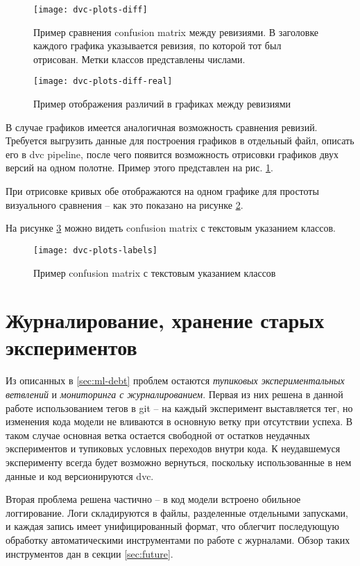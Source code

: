 \begin{figure}[!h]
    \centering
    \texttt{[image: dvc-plots-diff]}
    \caption{Пример сравнения confusion matrix между ревизиями. В заголовке каждого графика указывается ревизия, по которой тот был отрисован. Метки классов представлены числами.}
    \label{fig:dvc-plots-diff}
\end{figure}
\begin{figure}[!ht]
    \centering
    \texttt{[image: dvc-plots-diff-real]}
    \caption{Пример отображения различий в графиках между ревизиями}
    \label{fig:dvc-plots-diff-real}
\end{figure}
В случае графиков имеется аналогичная возможность сравнения ревизий.
Требуется выгрузить данные для построения графиков в отдельный файл, описать его в \gls{dvc} \gls{pipeline}, после чего появится возможность отрисовки графиков двух версий на одном полотне.
Пример этого представлен на рис. \ref{fig:dvc-plots-diff}.

При отрисовке кривых обе отображаются на одном графике для простоты визуального сравнения -- как это показано на рисунке \ref{fig:dvc-plots-diff-real}.

На рисунке \ref{fig:dvc-plots-labels} можно видеть confusion matrix с текстовым указанием классов.
\begin{figure}[!ht]
    \texttt{[image: dvc-plots-labels]}
    \caption{Пример confusion matrix с текстовым указанием классов}
    \label{fig:dvc-plots-labels}
\end{figure}

\section{Журналирование, хранение старых экспериментов}
Из описанных в \ref{sec:ml-debt} проблем остаются \textit{тупиковых экспериментальных ветвлений} и \textit{мониторинга с журналированием}.
Первая из них решена в данной работе использованием тегов в \gls{git} -- на каждый эксперимент выставляется тег, но изменения кода модели не вливаются в основную ветку при отсутствии успеха.
В таком случае основная ветка остается свободной от остатков неудачных экспериментов и тупиковых условных переходов внутри кода.
К неудавшемуся эксперименту всегда будет возможно вернуться, поскольку использованные в нем данные и код версионируются \gls{dvc}.

Вторая проблема решена частично -- в код модели встроено обильное логгирование.
Логи складируются в файлы, разделенные отдельными запусками, и каждая запись имеет унифицированный формат, что облегчит последующую обработку автоматическими инструментами по работе с журналами.
Обзор таких инструментов дан в секции \ref{sec:future}.

